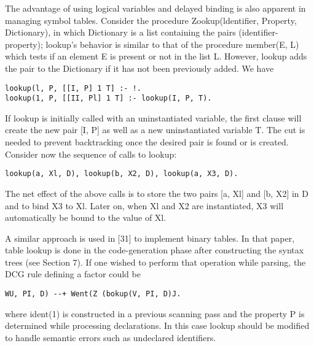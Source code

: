 The advantage of using logical variables and delayed binding is also
apparent in managing symbol tables. Consider the procedure Zookup(ldentifier,
Property, Dictionary), in which Dictionary is a list containing the pairs
(identifier-property); lookup’s behavior is similar to that of the procedure
member(E, L) which tests if an element E is present or not in the list L. However,
lookup adds the pair to the Dictionary if it has not been previously added. We
have
\begin{verbatim}
lookup(l, P, [[I, P] 1 T] :- !.
lookup(1, P, [[II, Pl] 1 T] :- lookup(I, P, T).
\end{verbatim}
If lookup is initially called with an uninstantiated variable, the first clause will
create the new pair [I, P] as well as a new uninstantiated variable T. The cut is
needed to prevent backtracking once the desired pair is found or is created. 
Consider now the sequence of calls to lookup:
\begin{verbatim}
lookup(a, Xl, D), lookup(b, X2, D), lookup(a, X3, D). 
\end{verbatim}

The net effect of the above calls is to store the two pairs [a, Xl] and [b, X2] in
D and to bind X3 to Xl. Later on, when Xl and X2 are instantiated, X3 will
automatically be bound to the value of Xl. 

A similar approach is used in [31] to implement binary tables. In that paper,
table lookup is done in the code-generation phase after constructing the syntax
trees (see Section 7). If one wished to perform that operation while parsing, the
DCG rule defining a factor could be
\begin{verbatim}
WU, PI, D) --+ Went(Z (bokup(V, PI, D)J. 
\end{verbatim}
where ident(1) is constructed in a previous scanning pass and the property P is
determined while processing declarations. In this case lookup should be modified
to handle semantic errors such as undeclared identifiers. 


 
\secup